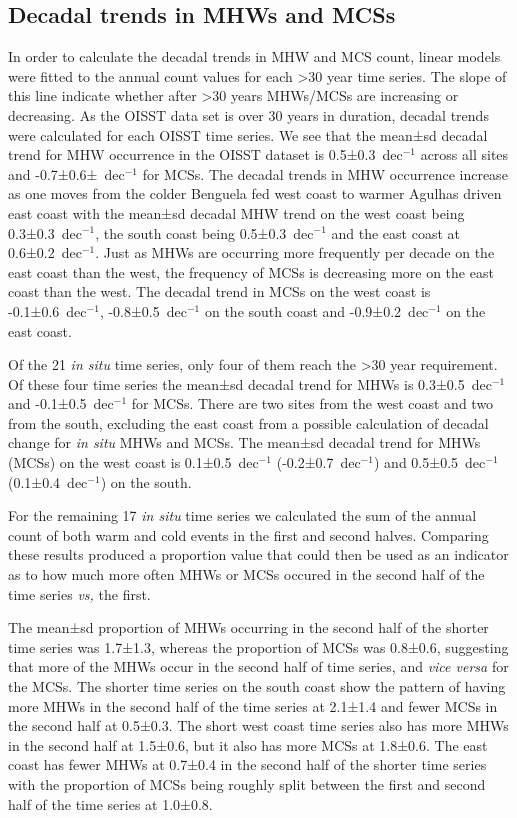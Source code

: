 \documentclass[a4paper,10pt,review]{elsarticle}
\begin{document}
\subsection{Decadal trends in MHWs and MCSs}
In order to calculate the decadal trends in MHW and MCS count, linear models were fitted to the annual count values for each >30 year time series. The slope of this line indicate whether after >30 years MHWs/MCSs are increasing or decreasing. As the OISST data set is over 30 years in duration, decadal trends were calculated for each OISST time series. We see that the mean±sd decadal trend for MHW occurrence in the OISST dataset is 0.5±0.3~dec$^{-1}$ across all sites and -0.7±0.6±~dec$^{-1}$ for MCSs. The decadal trends in MHW occurrence increase as one moves from the colder Benguela fed west coast to warmer Agulhas driven east coast with the mean±sd decadal MHW trend on the west coast being 0.3±0.3~dec$^{-1}$, the south coast being 0.5±0.3~dec$^{-1}$ and the east coast at 0.6±0.2~dec$^{-1}$. Just as MHWs are occurring more frequently per decade on the east coast than the west, the frequency of MCSs is decreasing more on the east coast than the west. The decadal trend in MCSs on the west coast is -0.1±0.6~dec$^{-1}$, -0.8±0.5~dec$^{-1}$ on the south coast and -0.9±0.2~dec$^{-1}$ on the east coast. 

Of the 21 \emph{in situ} time series, only four of them reach the >30 year requirement. Of these four time series the mean±sd decadal trend for MHWs is 0.3±0.5~dec$^{-1}$ and -0.1±0.5~dec$^{-1}$ for MCSs. There are two sites from the west coast and two from the south, excluding the east coast from a possible calculation of decadal change for \emph{in situ} MHWs and MCSs. The mean±sd decadal trend for MHWs (MCSs) on the west coast is 0.1±0.5~dec$^{-1}$ (-0.2±0.7~dec$^{-1}$) and 0.5±0.5~dec$^{-1}$ (0.1±0.4~dec$^{-1}$) on the south.

For the remaining 17 \emph{in situ} time series we calculated the sum of the annual count of both warm and cold events in the first and second halves. Comparing these results produced a proportion value that could then be used as an indicator as to how much more often MHWs or MCSs occured in the second half of the time series \emph{vs,} the first.


The mean±sd proportion of MHWs occurring in the second half of the shorter time series was 1.7±1.3, whereas the proportion of MCSs was 0.8±0.6, suggesting that more of the MHWs occur in the second half of time series, and \emph{vice versa} for the MCSs. The shorter time series on the south coast show the pattern of having more MHWs in the second half of the time series at 2.1±1.4 and fewer MCSs in the second half at 0.5±0.3. The short west coast time series also has more MHWs in the second half at 1.5±0.6, but it also has more MCSs at 1.8±0.6. The east coast has fewer MHWs at 0.7±0.4 in the second half of the shorter time series with the proportion of MCSs being roughly split between the first and second half of the time series at 1.0±0.8.
\end{document}
